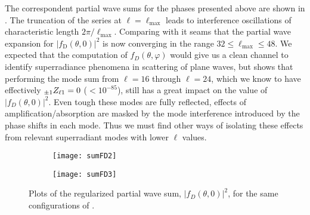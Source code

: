 The correspondent partial wave sums for the phases presented above are shown in .
The truncation of the series  at $\ell=\ell_\mathrm{max}$ leads to interference oscillations of characteristic length $2\pi/\ell_\mathrm{max}$.
Comparing with  it seams that the partial wave expansion for $|f_\mathrm{D}(\theta,0)|^2$ is now converging in the range $32 \le \ell_\mathrm{max} \le 48$.
We expected that the computation of $f_D(\theta, \varphi)$ would give us a clean channel to identify superradiance phenomena in scattering of plane waves, but  shows that performing the mode sum from $\ell=16$ through $\ell=24$, which we know to have effectively $\uu[\pm 1]{Z}{\ell 1}=0$ ($<10^{-85}$), still has a great impact on the value of $|f_D(\theta,0)|^2$.
Even tough these modes are fully reflected, effects of amplification/absorption are masked by the mode interference introduced by the phase shifts in each mode.
Thus we must find other ways of isolating these effects from relevant superradiant modes with lower $\ell$ values.
\begin{figure}[h]
	\centering
	\vspace{0.2cm}
	\begin{subfigure}[c]{0.49\textwidth}
        \texttt{[image: sumFD2]}
    \end{subfigure}
    \hfill
    \begin{subfigure}[c]{0.48\textwidth}
        \texttt{[image: sumFD3]}
    \end{subfigure}
    \hfill
	\caption{Plots of the regularized partial wave sum, $|f_D(\theta,0)|^2$, for the same configurations of .}
	\label{fig5:fD}
\end{figure}

\cleardoublepage